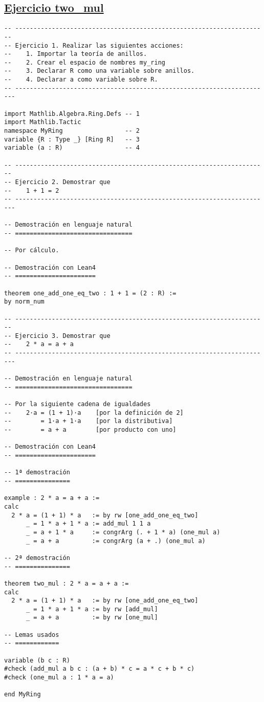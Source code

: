 \subsection{\href{./src/Basicos/two\_mul.lean}{Ejercicio two\_mul}}
\label{sec:orgd13c8c5}
\begin{verbatim}
-- ---------------------------------------------------------------------
-- Ejercicio 1. Realizar las siguientes acciones:
--    1. Importar la teoría de anillos.
--    2. Crear el espacio de nombres my_ring
--    3. Declarar R como una variable sobre anillos.
--    4. Declarar a como variable sobre R.
-- ----------------------------------------------------------------------

import Mathlib.Algebra.Ring.Defs -- 1
import Mathlib.Tactic
namespace MyRing                 -- 2
variable {R : Type _} [Ring R]   -- 3
variable (a : R)                 -- 4

-- ---------------------------------------------------------------------
-- Ejercicio 2. Demostrar que
--    1 + 1 = 2
-- ----------------------------------------------------------------------

-- Demostración en lenguaje natural
-- ================================

-- Por cálculo.

-- Demostración con Lean4
-- ======================

theorem one_add_one_eq_two : 1 + 1 = (2 : R) :=
by norm_num

-- ---------------------------------------------------------------------
-- Ejercicio 3. Demostrar que
--    2 * a = a + a
-- ----------------------------------------------------------------------

-- Demostración en lenguaje natural
-- ================================

-- Por la siguiente cadena de igualdades
--    2·a = (1 + 1)·a    [por la definición de 2]
--        = 1·a + 1·a    [por la distributiva]
--        = a + a        [por producto con uno]

-- Demostración con Lean4
-- ======================

-- 1ª demostración
-- ===============

example : 2 * a = a + a :=
calc
  2 * a = (1 + 1) * a   := by rw [one_add_one_eq_two]
      _ = 1 * a + 1 * a := add_mul 1 1 a
      _ = a + 1 * a     := congrArg (. + 1 * a) (one_mul a)
      _ = a + a         := congrArg (a + .) (one_mul a)

-- 2ª demostración
-- ===============

theorem two_mul : 2 * a = a + a :=
calc
  2 * a = (1 + 1) * a   := by rw [one_add_one_eq_two]
      _ = 1 * a + 1 * a := by rw [add_mul]
      _ = a + a         := by rw [one_mul]

-- Lemas usados
-- ============

variable (b c : R)
#check (add_mul a b c : (a + b) * c = a * c + b * c)
#check (one_mul a : 1 * a = a)

end MyRing
\end{verbatim}


